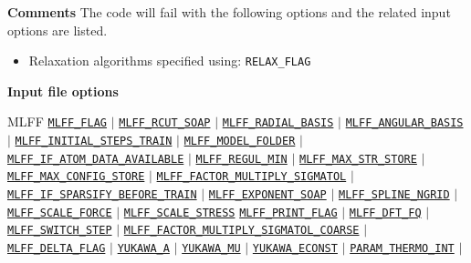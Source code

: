 \begin{frame}[allowframebreaks]{\textbf{Comments}} \label{Introduction}
The code will fail with the following options and the related input options are listed.
\begin{itemize}
  \item Relaxation algorithms specified using: \texttt{RELAX\_FLAG}
\end{itemize}

\end{frame}

\begin{frame}[allowframebreaks]{\textbf{Input file options}} \label{Index}
\vspace{-2mm}
 \begin{block}{MLFF}
\hyperlink{MLFF_FLAG}{\texttt{MLFF\_FLAG}} $\vert$
\hyperlink{MLFF_RCUT_SOAP}{\texttt{MLFF\_RCUT\_SOAP}} $\vert$
\hyperlink{MLFF_RADIAL_BASIS}{\texttt{MLFF\_RADIAL\_BASIS}} $\vert$ 
\hyperlink{MLFF_ANGULAR_BASIS}{\texttt{MLFF\_ANGULAR\_BASIS}} $\vert$ 
\hyperlink{MLFF_INITIAL_STEPS_TRAIN}{\texttt{MLFF\_INITIAL\_STEPS\_TRAIN}} $\vert$ 
\hyperlink{MLFF_MODEL_FOLDER}{\texttt{MLFF\_MODEL\_FOLDER}} $\vert$ 
\hyperlink{MLFF_IF_ATOM_DATA_AVAILABLE}{\texttt{MLFF\_IF\_ATOM\_DATA\_AVAILABLE}}  $\vert$ 
\hyperlink{MLFF_REGUL_MIN}{\texttt{MLFF\_REGUL\_MIN}} $\vert$
\hyperlink{MLFF_MAX_STR_STORE}{\texttt{MLFF\_MAX\_STR\_STORE}} $\vert$ 
\hyperlink{MLFF_MAX_CONFIG_STORE}{\texttt{MLFF\_MAX\_CONFIG\_STORE}} $\vert$ 
\hyperlink{MLFF_FACTOR_MULTIPLY_SIGMATOL}{\texttt{MLFF\_FACTOR\_MULTIPLY\_SIGMATOL}} $\vert$
\hyperlink{MLFF_IF_SPARSIFY_BEFORE_TRAIN}{\texttt{MLFF\_IF\_SPARSIFY\_BEFORE\_TRAIN}} $\vert$
\hyperlink{MLFF_EXPONENT_SOAP}{\texttt{MLFF\_EXPONENT\_SOAP}} $\vert$
\hyperlink{MLFF_SPLINE_NGRID}{\texttt{MLFF\_SPLINE\_NGRID}} $\vert$
\hyperlink{MLFF_SCALE_FORCE}{\texttt{MLFF\_SCALE\_FORCE}} $\vert$
\hyperlink{MLFF_SCALE_STRESS}{\texttt{MLFF\_SCALE\_STRESS}}
\hyperlink{MLFF_PRINT_FLAG}{\texttt{MLFF\_PRINT\_FLAG}} $\vert$
\hyperlink{MLFF_DFT_FQ}{\texttt{MLFF\_DFT\_FQ}} $\vert$ 
\hyperlink{MLFF_SWITCH_STEP}{\texttt{MLFF\_SWITCH\_STEP}} $\vert$ 
\hyperlink{MLFF_FACTOR_MULTIPLY_SIGMATOL_COARSE}{\texttt{MLFF\_FACTOR\_MULTIPLY\_SIGMATOL\_COARSE}} $\vert$ 
\hyperlink{MLFF_DELTA_FLAG}{\texttt{MLFF\_DELTA\_FLAG}} $\vert$ 
\hyperlink{YUKAWA_A}{\texttt{YUKAWA\_A}} $\vert$ 
\hyperlink{YUKAWA_MU}{\texttt{YUKAWA\_MU}} $\vert$ 
\hyperlink{YUKAWA_ECONST}{\texttt{YUKAWA\_ECONST}} $\vert$ 
\hyperlink{PARAM_THERMO_INT}{\texttt{PARAM\_THERMO\_INT}} $\vert$ 
\end{block}

\end{frame}
